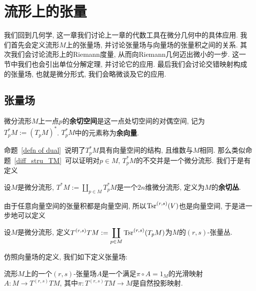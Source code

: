 \chapter{流形上的张量}\label{chapter_tensorfield}
我们回到几何学, 这一章我们讨论上一章的代数工具在微分几何中的具体应用.
我们首先会定义流形$M$上的张量场, 并讨论张量场与向量场的张量积之间的关系.
其次我们会讨论流形上的Riemann度量, 从而向Riemann几何迈出微小的一步.
这一节中我们也会引出单位分解定理, 并讨论它的应用.
最后我们会讨论交错映射构成的张量场, 也就是微分形式, 我们会略微谈及它的应用.

\section{张量场}
\begin{defn}
    微分流形$M$上一点$p$的\textbf{余切空间}是这一点处切空间的对偶空间, 记为$T^*_pM:=(T_pM)^*$.
    $T^*_pM$中的元素称为\textbf{余向量}.
\end{defn}

命题~\ref{defn of dual}~说明了$T^*_pM$具有向量空间的结构, 且维数与$M$相同.
那么类似命题~\ref{diff_stru_TM}~可以证明对$p\in M$, $T^*_pM$的不交并是一个微分流形.
我们于是有定义
\begin{defn}
    设$M$是微分流形, $\displaystyle T^*M:=\coprod_{p\in M}T^*_pM$是一个$2n$维微分流形, 定义为$M$的\textbf{余切丛}.
\end{defn}

由于任意向量空间的张量积都是向量空间, 所以$\operatorname{Tsr}^{(r,s)}(V)$也是向量空间, 于是进一步地可以定义
\begin{defn}
    设$M$是微分流形, 定义$\displaystyle T^{(r,s)}TM:=\coprod_{p\in M}\operatorname{Tsr}^{(r,s)}(T_pM)$为$M$的$(r,s)$-张量丛.
\end{defn}

仿照向量场的定义, 我们如下定义张量场:
\begin{defn}
    流形$M$上的一个$(r,s)$-张量场$A$是一个满足$\pi\circ A=1_M$的光滑映射$A:M\to T^{(r,s)}TM$, 其中$\pi:T^{(r,s)}TM\to M$是自然投影映射.
\end{defn}

